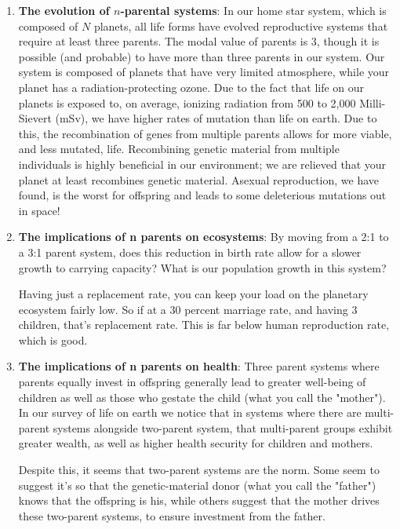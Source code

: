\begin{enumerate}
    \item \textbf{The evolution of $n$-parental systems}: In our home star system, which is composed of $N$ planets, all life forms have evolved reproductive systems that require at least three parents. The modal value of parents is 3, though it is possible (and probable) to have more than three parents in our system. Our system is composed of planets that have very limited atmosphere, while your planet has a radiation-protecting ozone. Due to the fact that life on our planets is exposed to, on average, ionizing radiation from 500 to 2,000 Milli-Sievert (mSv), we have higher rates of mutation than life on earth. Due to this, the recombination of genes from multiple parents allows for more viable, and less mutated, life. Recombining genetic material from multiple individuals is highly beneficial in our environment; we are relieved that your planet at least recombines genetic material. Asexual reproduction, we have found, is the worst for offspring and leads to some deleterious mutations out in space!

    \item \textbf{The implications of n parents on ecosystems}: By moving from a 2:1 to a 3:1 parent system, does this reduction in birth rate allow for a slower growth to carrying capacity? What is our population growth in this system?

Having just a replacement rate, you can keep your load on the planetary ecosystem fairly low. So if at a 30 percent marriage rate, and having 3 children, that's replacement rate. This is far below human reproduction rate, which is good.

\item \textbf{The implications of n parents on health}: Three parent systems where parents equally invest in offspring generally lead to greater well-being of children as well as those who gestate the child (what you call the "mother"). In our survey of life on earth we notice that in systems where there are multi-parent systems alongside two-parent system, that multi-parent groups exhibit greater wealth, as well as higher health security for children and mothers.

Despite this, it seems that two-parent systems are the norm. Some seem to suggest it's so that the genetic-material donor (what you call the "father") knows that the offspring is his, while others suggest that the mother drives these two-parent systems, to ensure investment from the father. 


\end{enumerate}
